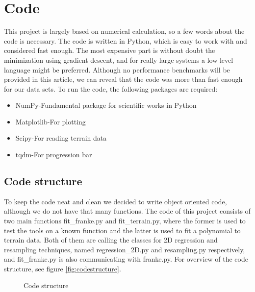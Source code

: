 \section{Code} \label{sec:code}
This project is largely based on numerical calculation, so a few words about the code is necessary. The code is written in Python, which is easy to work with and considered fast enough. The most expensive part is without doubt the minimization using gradient descent, and for really large systems a low-level language might be preferred. Although no performance benchmarks will be provided in this article, we can reveal that the code was more than fast enough for our data sets. To run the code, the following packages are required:
\begin{itemize}
\item NumPy\quad-\quad Fundamental package for scientific works in Python
\item Matplotlib\quad-\quad For plotting
\item Scipy\quad-\quad For reading terrain data
\item tqdm\quad-\quad For progression bar
\end{itemize}

\subsection{Code structure} \label{sec:structure}
To keep the code neat and clean we decided to write object oriented code, although we do not have that many functions. The code of this project consists of two main functions fit\_franke.py and fit\_terrain.py, where the former is used to test the tools on a known function and the latter is used to fit a polynomial to terrain data. Both of them are calling the classes for 2D regression and resampling techniques, named regression\_2D.py and resampling.py respectively, and fit\_franke.py is also communicating with franke.py. For overview of the code structure, see figure \eqref{fig:codestructure}.
\begin{figure}
\centering
{}
\caption{Code structure}
\label{fig:codestructure}
\end{figure}

